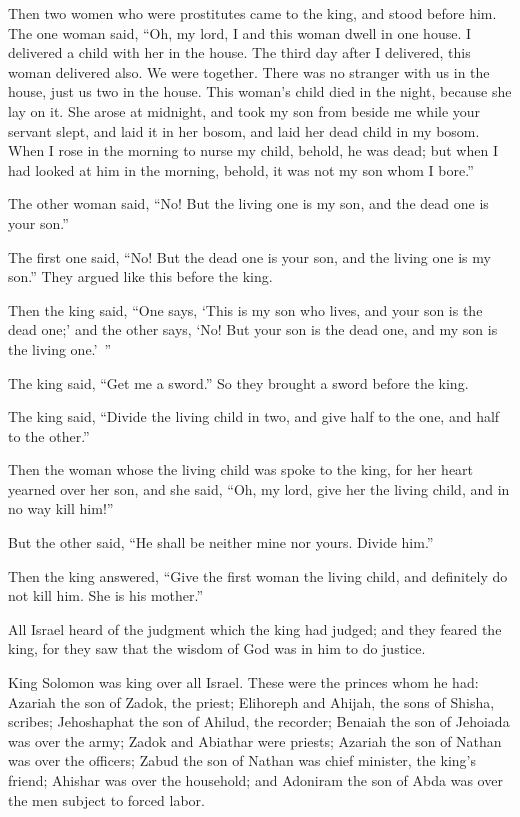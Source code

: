 \myverse{}Then two women who were prostitutes came to the king, and stood
before him.
\myverse{}The one woman said, “Oh, my lord, I and this woman dwell in one house. I delivered
a child with her in the house.
\myverse{}The third day after I delivered, this woman delivered also. We were together.
There was no stranger with us in the house, just us two in the house.
\myverse{}This woman’s child died in the night, because she lay on it.
\myverse{}She arose at midnight, and took my son from beside me while your servant slept,
and laid it in her bosom, and laid her dead child in my bosom.
\myverse{}When I rose in the morning to nurse my child, behold, he was dead; but when
I had looked at him in the morning, behold, it was not my son whom I bore.”

\myverse{}The other woman said, “No! But the living one is my son, and
the dead one is your son.”

The first one said, “No! But the dead one is your son, and the living one is my son.” They
argued like this before the king.

\myverse{}Then the king said, “One says, ‘This is my son who lives, and
your son is the dead one;’ and the other says, ‘No! But your son is the dead one, and my son is the living
one.’ ”

\myverse{}The king said, “Get me a sword.” So they brought a sword before
the king.

\myverse{}The king said, “Divide the living child in two, and give half
to the one, and half to the other.”

\myverse{}Then the woman whose the living child was spoke to the king,
for her heart yearned over her son, and she said, “Oh, my lord, give her the living child, and in no way
kill him!”

But the other said, “He shall be neither mine nor yours. Divide him.”

\myverse{}Then the king answered, “Give the first woman the living child,
and definitely do not kill him. She is his mother.”

\myverse{}All Israel heard of the judgment which the king had judged; and
they feared the king, for they saw that the wisdom of God was in him to do justice.


\mychapter{} \myverse*{}King Solomon was king over all Israel.
\myverse{}These were the princes whom he had: Azariah the son of Zadok, the priest;
\myverse{}Elihoreph and Ahijah, the sons of Shisha, scribes; Jehoshaphat the son of Ahilud,
the recorder;
\myverse{}Benaiah the son of Jehoiada was over the army; Zadok and Abiathar were priests;
\myverse{}Azariah the son of Nathan was over the officers; Zabud the son of Nathan was
chief minister, the king’s friend;
\myverse{}Ahishar was over the household; and Adoniram the son of Abda was over the men
subject to forced labor.

